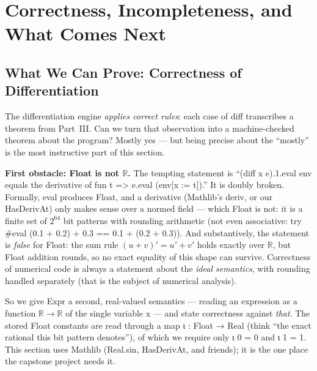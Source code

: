 \documentclass[12pt, openany]{book}
\theoremstyle{plain}
\theoremstyle{definition}
\theoremstyle{remark}
\newcommand{\R}{\mathbb{R}}
\newcommand{\li}[1]{{\ttfamily\small\color{tealaccent}#1}}
\begin{document}
\chapter{Correctness, Incompleteness, and What Comes Next}
\color{black}

\section{What We Can Prove: Correctness of Differentiation}

The differentiation engine \emph{applies correct rules}: each case of \li{diff}
transcribes a theorem from Part~III.  Can we turn that observation into a
machine-checked theorem about the program?  Mostly yes --- but being precise
about the ``mostly'' is the most instructive part of this section.

\textbf{First obstacle: \li{Float} is not $\R$.}  The tempting statement is
``\li{(diff x e).1.eval env} equals the derivative of \li{fun t => e.eval
(env[x := t])}.''  It is doubly broken.  Formally, \li{eval} produces
\li{Float}, and a derivative (Mathlib's \li{deriv}, or our \li{HasDerivAt})
only makes sense over a normed field --- which \li{Float} is not: it is a
finite set of $2^{64}$ bit patterns with rounding arithmetic (not even
associative: try \li{\#eval (0.1 + 0.2) + 0.3 == 0.1 + (0.2 + 0.3)}).
And substantively, the statement is \emph{false} for Float: the sum rule
$(u+v)' = u' + v'$ holds exactly over $\R$, but Float addition rounds, so no
exact equality of this shape can survive.  Correctness of numerical code is
always a statement about the \emph{ideal semantics}, with rounding handled
separately (that is the subject of numerical analysis).

So we give \li{Expr} a second, real-valued semantics --- reading an expression
as a function $\R \to \R$ of the single variable \li{x} --- and state
correctness against \emph{that}.  The stored \li{Float} constants are read
through a map \li{ι : Float → Real} (think ``the exact rational this bit
pattern denotes''), of which we require only \li{ι 0 = 0} and \li{ι 1 = 1}.
This section uses Mathlib (\li{Real.sin}, \li{HasDerivAt}, and friends);
it is the one place the capstone project needs it.
\end{document}
